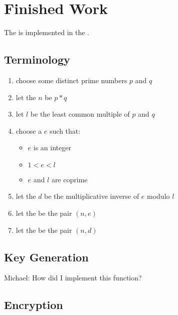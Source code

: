 \section{Finished Work}

The \cs{} \rsa{} is implemented in the \cf{} \cry.

\cite{RSA}


\subsection{Terminology}

\begin{enumerate}
\item choose some distinct prime numbers $p$ and $q$
\item let the  $n$ be $p * q$
\item let $l$ be the least common multiple of $p$ and $q$
\item choose a  $e$ such that:
  \begin{itemize}
  \item $e$ is an integer
  \item $1 < e < l$
  \item $e$ and $l$ are coprime
  \end{itemize}
\item let the  $d$ be
  the multiplicative inverse of $e$ modulo $l$
\item let the  be the pair $(n, e)$
\item let the  be the pair $(n, d)$
\end{enumerate}


\subsection{Key Generation}

Michael:
How did I implement this function?


\subsection{Encryption}

